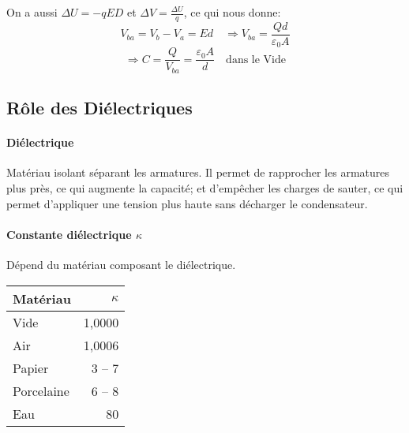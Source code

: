 \begin{multicols*}{2}
    On a aussi $\Delta U = -qED$ et $\Delta V = \frac{\Delta U}{q}$, ce qui nous donne:
    \[ V_{ba} = V_b - V_a = Ed \quad \Rightarrow V_{ba} = \frac{Qd}{\varepsilon_0 A} \]
    \[ \Rightarrow C = \frac{Q}{V_{ba}} = \frac{\varepsilon_0 A}{d} \quad \text{dans le Vide} \]
    
    \subsection{Rôle des Diélectriques}
    \begin{center}
    \end{center}
    \paragraph{Diélectrique} 
    Matériau isolant séparant les armatures. Il permet de rapprocher les armatures plus près, ce qui augmente la capacité; et d'empêcher les charges de sauter, ce qui permet d'appliquer une tension plus haute sans décharger le condensateur.
    
    \paragraph{Constante diélectrique $\kappa$}
    Dépend du matériau composant le diélectrique.
    
    \begin{center}
        \begin{tabular}{lr}
            \toprule
            Matériau & $\kappa$ \\
            \midrule
            Vide & 1,0000 \\
            Air & 1,0006 \\
            Papier & 3 -- 7 \\
            Porcelaine & 6 -- 8 \\
            Eau & 80 \\
            \bottomrule
        \end{tabular}
    \end{center}
        

\end{multicols*}
